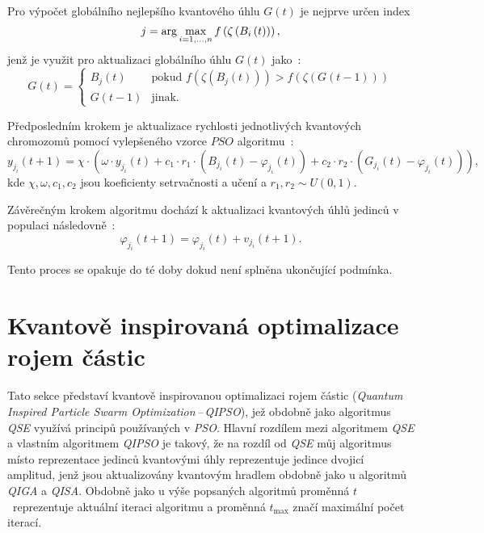 Pro výpočet globálního nejlepšího kvantového úhlu $G\left(t\right)$ je nejprve určen index
\begin{equation*}
    j = \arg\max_{i=1,\dots,n} f\left(\zeta\left(B_i\left(t\right)\right)\right),\\[5pt]
\end{equation*}
jenž je využit pro aktualizaci globálního úhlu $G\left(t\right)$ jako~\cite{qse}:
\begin{equation}\label{eq:glob-best}
    G\left(t\right) =
    \begin{cases}
        B_j\left(t\right)   & \text{pokud } f\left(\zeta\left(B_j\left(t\right)\right)\right) > f\left(\zeta\left(G\left(t-1\right)\right)\right) \\
        G\left(t-1\right)   & \text{jinak.}
    \end{cases}
\end{equation}

Předposledním krokem je aktualizace rychlosti jednotlivých kvantových chromozomů pomocí vylepšeného vzorce $PSO$ algoritmu~\cite{qse}: 
\begin{equation}\label{eq:qse-velocity}
    y_{j_i}\left(t+1\right) = \chi \cdot
    \left( \omega \cdot y_{j_i}\left(t\right) 
        + c_1 \cdot r_1 \cdot \left(B_{j_i}\left(t\right) - \varphi_{j_i}\left(t\right) \right)
        + c_2 \cdot r_2 \cdot \left( G_{j_i}\left(t\right) - \varphi_{j_i}\left(t\right) \right)\right),
\end{equation}
kde $\chi, \omega, c_1 , c_2$ jsou koeficienty setrvačnosti a učení a $r_1,r_2\sim U\left(0,1\right)$.  

Závěrečným krokem algoritmu dochází k aktualizaci kvantových úhlů jedinců v populaci následovně~\cite{qse}:
\begin{equation*}
    \varphi_{j_i}\left(t+1\right) = \varphi_{j_i}\left(t\right) + v_{j_i}\left(t+1\right).
\end{equation*}

Tento proces se opakuje do té doby dokud není splněna ukončující podmínka.

\section{Kvantově inspirovaná optimalizace rojem částic}\label{sec:qipso}
Tato sekce představí kvantově inspirovanou optimalizaci rojem částic (\emph{Quantum Inspired Particle Swarm Optimization\,--\,QIPSO}), jež obdobně jako algoritmus \emph{QSE} využívá principů používaných v \emph{PSO}. 
Hlavní rozdílem mezi algoritmem \emph{QSE} a vlastním algoritmem \emph{QIPSO} je takový, že na rozdíl od \emph{QSE} můj algoritmus místo reprezentace jedinců kvantovými úhly reprezentuje jedince dvojicí amplitud, jenž jsou aktualizovány kvantovým hradlem obdobně jako u algoritmů \emph{QIGA} a \emph{QISA}. 
Obdobně jako u výše popsaných algoritmů proměnná $t$~reprezentuje aktuální iteraci algoritmu a proměnná $t_{\text{max}}$ značí maximální počet iterací. 

